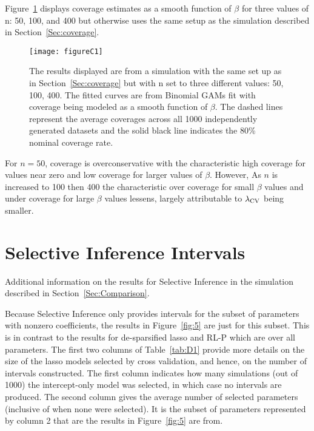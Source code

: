 Figure~\ref{fig:C1} displays coverage estimates as a smooth function of $\beta$ for three values of n: 50, 100, and 400 but otherwise uses the same setup as the simulation described in Section~\ref{Sec:coverage}.

\begin{figure}[hbtp]
  \begin{center}
  \texttt{[image: figureC1]}
  \caption{\label{fig:C1} The results displayed are from a simulation with the same set up as in Section~\ref{Sec:coverage} but with n set to three different values: 50, 100, 400. The fitted curves are from Binomial GAMs fit with coverage being modeled as a smooth function of $\beta$. The dashed lines represent the average coverages across all 1000 independently generated datasets and the solid black line indicates the 80\% nominal coverage rate.}
  \end{center}
\end{figure}

For $n = 50$, coverage is overconservative with the characteristic high coverage for values near zero and low coverage for larger values of $\beta$. However, As $n$ is increased to 100 then 400 the characteristic over coverage for small $\beta$ values and under coverage for large $\beta$ values lessens, largely attributable to $\lambda_{\textrm{CV}}$ being smaller.

\clearpage

\section{Selective Inference Intervals}\label{Sup:si_int_info}


\begin{table}[hb]
  \singlespace
  \centering
  
  \caption{Additional information on the results for Selective Inference in the simulation described in Section~\ref{Sec:Comparison}.}
  \label{tab:D1}
\end{table}


Because Selective Inference only provides intervals for the subset of parameters with nonzero coefficients, the results in Figure~\ref{fig:5} are just for this subset. This is in contrast to the results for de-sparsified lasso and RL-P which are over all parameters. The first two columns of Table~\ref{tab:D1} provide more details on the size of the lasso models selected by cross validation, and hence, on the number of intervals constructed. The first column indicates how many simulations (out of 1000) the intercept-only model was selected, in which case no intervals are produced. The second column gives the average number of selected parameters (inclusive of when none were selected). It is the subset of parameters represented by column 2 that are the results in Figure~\ref{fig:5} are from.

